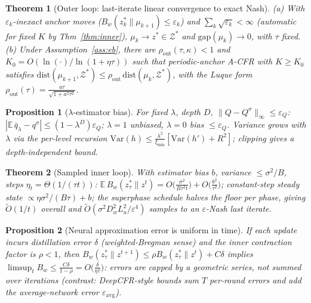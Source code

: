 \documentclass{article}
\newtheorem{theorem}{Theorem}
\newtheorem{proposition}{Proposition}
\newcommand{\Zs}{\mathcal{Z}^*}
\newcommand{\gap}{\mathrm{gap}}
\newcommand{\dist}{\mathrm{dist}}
\newcommand{\Bw}{B_w}
\begin{document}
\begin{theorem}[Outer loop: last-iterate linear convergence to exact Nash]
\label{thm:outer}
(a) With $\varepsilon_k$-inexact anchor moves
($\Bw(z^*_k\|\mu_{k+1})\le\varepsilon_k$) and
$\sum_k\sqrt{\varepsilon_k}<\infty$ (automatic for fixed $K$ by
Thm~\ref{thm:inner}), $\mu_k\to z^*\in\Zs$ and $\gap(\mu_k)\to 0$, with
$\tau$ fixed.
(b) Under Assumption~\ref{ass:eb}, there are $\rho_{\mathrm{out}}(\tau,\kappa)<1$
and $K_0=O(\ln(\cdot)/\ln(1+\eta\tau))$ such that periodic-anchor A-CFR
with $K\ge K_0$ satisfies
$\dist(\mu_{k+1},\Zs)\le\rho_{\mathrm{out}}\,\dist(\mu_k,\Zs)$, with the
Luque form $\rho_{\mathrm{out}}(\tau)=\frac{a\tau}{\sqrt{1+a^2\tau^2}}$.
\end{theorem}

\begin{proposition}[$\lambda$-estimator bias]
\label{prop:lambda}
For fixed $\lambda$, depth $D$, $\|Q-Q^{\sigma}\|_\infty\le\varepsilon_Q$:
$|\mathbb{E}\,\bar q_\lambda - q^\sigma|\le(1-\lambda^{D})\varepsilon_Q$;
$\lambda=1$ unbiased, $\lambda=0$ bias $\le\varepsilon_Q$.  Variance
grows with $\lambda$ via the per-level recursion
$\mathrm{Var}(h)\le \frac{\lambda^2}{\xi_{\min}}[\mathrm{Var}(h')+R^2]$;
clipping gives a depth-independent bound.
\end{proposition}

\begin{theorem}[Sampled inner loop]
\label{thm:sampled}
With estimator bias $b$, variance $\le\sigma^2/B$, steps
$\eta_t=\Theta(1/(\tau t))$:
$\mathbb{E}\,\Bw(z^*_\tau\|z^t)
 = O\!\big(\tfrac{\sigma^2}{B\tau^2 t}\big)
 + O\!\big(\tfrac{b^2}{\tau^2}\big)$;
constant-step steady state $\propto \eta\sigma^2/(B\tau)+b$; the
superphase schedule halves the floor per phase, giving
$\widetilde O(1/t)$ overall and
$\widetilde O(\sigma^2 D_w^2 L_u^2/\varepsilon^4)$ samples to an
$\varepsilon$-Nash last iterate.
\end{theorem}

\begin{proposition}[Neural approximation error is uniform in time]
\label{prop:neural}
If each update incurs distillation error $\delta$ (weighted-Bregman
sense) and the inner contraction factor is $\rho<1$, then
$\Bw(z^*_\tau\|z^{t+1})\le\rho \Bw(z^*_\tau\|z^t)+C\delta$ implies
$\limsup_t \Bw \le \frac{C\delta}{1-\rho}=O\big(\frac{\delta}{\eta\tau}\big)$:
errors are capped by a geometric series, not summed over iterations
(contrast: DeepCFR-style bounds sum $T$ per-round errors and add the
average-network error $\varepsilon_{\mathrm{avg}}$).
\end{proposition}
\end{document}
